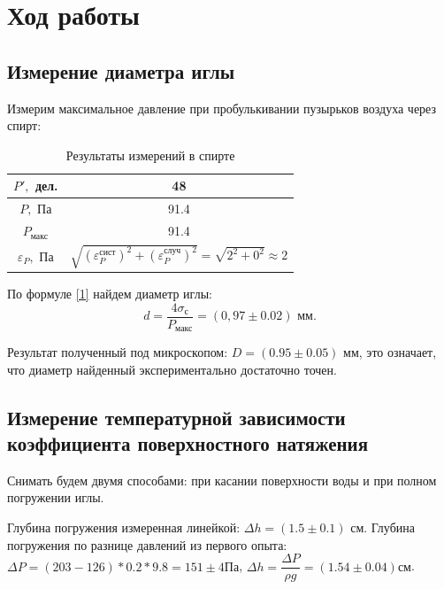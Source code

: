 \documentclass[a4paper,12pt]{article}
\theoremstyle{definition}
\begin{document}
	\section{Ход работы}
	\subsection{Измерение диаметра иглы}
	Измерим максимальное давление при пробулькивании пузырьков воздуха через спирт:
	\bgroup
	\def\arraystretch{1.7}%
	\begin{table}[H]
		\begin{center}
			\begin{tabular}{|c|c|}
				\hline
				$P',$ дел. &48\\
				\hline
				$P,$ Па& 91.4\\
				\hline
				$P_{\text{макс}}$& 91.4\\
				\hline
				$\varepsilon_P,$ Па&$\sqrt{\left(\varepsilon_P^\text{сист}\right)^2 + \left(\varepsilon_P^\text{случ}\right)^2} = \sqrt{2^2 + 0^2} \approx 2$\\
				\hline
			\end{tabular}
		\end{center}
		\caption{Результаты измерений в спирте}
		\label{tab1}
	\end{table}
	\egroup
	
	По формуле \eqref{1} найдем диаметр иглы:
	\begin{equation*}
		d = \frac{4\sigma_{\text{с}}}{P_\text{макс}} = (0,97\pm 0.02)\text{ мм}.
	\end{equation*}

	Результат полученный под микроскопом: $D = (0.95\pm0.05)$ мм, это означает, что диаметр найденный экспериментально достаточно точен.
	
	\subsection{Измерение температурной зависимости коэффициента поверхностного натяжения}
	
	Снимать будем двумя способами: при касании поверхности воды и при полном погружении иглы.
	
	Глубина погружения измеренная линейкой: $\Delta h = (1.5\pm0.1)$ см. Глубина погружения по разнице давлений из первого опыта: $\Delta P = (203-126)*0.2*9.8 = 151\pm4 Па$, $\Delta h = \dfrac{\Delta P}{\rho g} = (1.54\pm0.04)см$.
	
\end{document}
